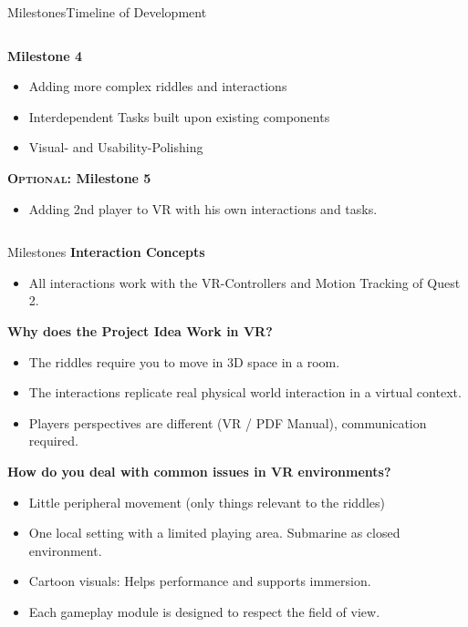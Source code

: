 \documentclass[t,aspectratio=169,divpsnames]{beamer}
\begin{document}
\begin{frame}{Milestones}{Timeline of Development}
\begin{columns}[T]
\begin{column}{0.35\textwidth}
\textbf{Milestone 4}
\begin{itemize}
    \item Adding more complex riddles and interactions
    \item Interdependent Tasks built upon existing components
    \item Visual- and Usability-Polishing    
\end{itemize}
\textbf{\textsc{Optional:} Milestone 5}
\begin{itemize}
    \item Adding 2nd player to VR with his own interactions and tasks.  
\end{itemize}
\end{column}
\end{columns}
\end{frame}
\begin{frame}{Milestones}
\textbf{Interaction Concepts} 
\begin{itemize}
    \item All interactions work with the VR-Controllers and Motion Tracking of Quest 2.
\end{itemize}
\textbf{Why does the Project Idea Work in VR?}
\begin{itemize}
    \item  The riddles require you to move in 3D space in a room.
    \item The interactions replicate real physical world interaction in a virtual context.
    \item Players perspectives are different (VR / PDF Manual), communication required.
\end{itemize}
\textbf{How do you deal with common issues in VR environments?} 
\begin{itemize}
    \item Little peripheral movement (only things relevant to the riddles)
    \item One local setting with a limited playing area. Submarine as closed environment.
    \item Cartoon visuals: Helps performance and supports immersion.
    \item Each gameplay module is designed to respect the field of view.
\end{itemize}
\end{frame}
\end{document}
